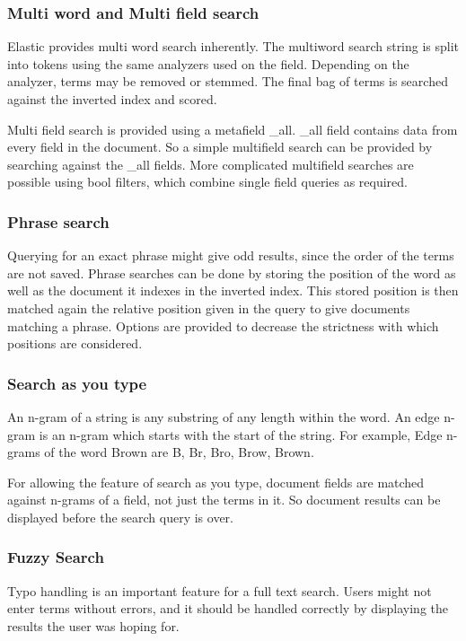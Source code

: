\documentclass[12pt]{article}
\begin{document}
			\subsubsection{Multi word and Multi field search}
				Elastic provides multi word search inherently. The multiword search string is split into tokens using the same analyzers used on the field. Depending on the analyzer, terms may be removed or stemmed. The final bag of terms is searched against the inverted index and scored.

				Multi field search is provided using a metafield \_all. \_all field contains data from every field in the document. So a simple multifield search can be provided by searching against the \_all fields. More complicated multifield searches are possible using bool filters, which combine single field queries as required.
			\subsubsection{Phrase search}
				Querying for an exact phrase might give odd results, since the order of the terms are not saved. Phrase searches can be done by storing the position of the word as well as the document it indexes in the inverted index. This stored position is then matched again the relative position given in the query to give documents matching a phrase. Options are provided to decrease the strictness with which positions are considered.

			\subsubsection{Search as you type}
				An n-gram of a string is any substring of any length within the word. An edge n-gram is an n-gram which starts with the start of the string. For example, Edge n-grams of the word Brown are B, Br, Bro, Brow, Brown. 

				For allowing the feature of search as you type, document fields are matched against n-grams of a field, not just the terms in it. So document results can be displayed before the search query is over.

			\subsubsection{Fuzzy Search}
				Typo handling is an important feature for a full text search. Users might not enter terms without errors, and it should be handled correctly by displaying the results the user was hoping for. 
\end{document}
